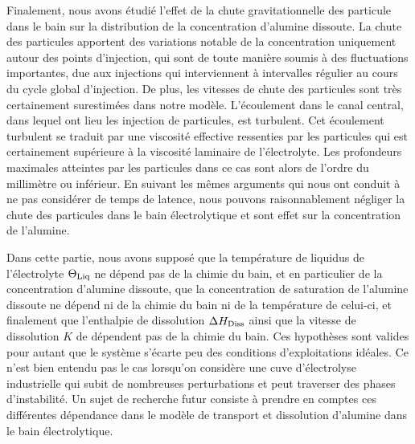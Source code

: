 Finalement, nous avons étudié l'effet de la chute gravitationnelle des
particule dans le bain sur la distribution de la concentration
d'alumine dissoute. La chute des particules apportent des variations
notable de la concentration uniquement autour des points d'injection,
qui sont de toute manière soumis à des fluctuations importantes, due
aux injections qui interviennent à intervalles régulier au cours du
cycle global d'injection. De plus, les vitesses de chute des
particules sont très certainement surestimées dans notre
modèle. L'écoulement dans le canal central, dans lequel ont lieu les
injection de particules, est turbulent. Cet écoulement turbulent se
traduit par une viscosité effective ressenties par les particules qui
est certainement supérieure à la viscosité laminaire de
l'électrolyte. Les profondeurs maximales atteintes par les particules
dans ce cas sont alors de l'ordre du millimètre ou inférieur. En
suivant les mêmes arguments qui nous ont conduit à ne pas considérer
de temps de latence, nous pouvons raisonnablement négliger la chute
des particules dans le bain électrolytique et sont effet sur la
concentration de l'alumine.

Dans cette partie, nous avons supposé que la température de liquidus de
l'électrolyte $\Theta_\text{Liq}$ ne dépend pas de la chimie du bain, et en
particulier de la concentration d'alumine dissoute, que la
concentration de saturation de l'alumine dissoute ne dépend ni de la
chimie du bain ni de la température de celui-ci, et finalement que
l'enthalpie de dissolution $\Delta H_\text{Diss}$ ainsi que la vitesse
de dissolution $K$ de dépendent pas de la chimie du bain. Ces hypothèses
sont valides pour autant que le système s'écarte peu des conditions
d'exploitations idéales. Ce n'est bien entendu pas le cas lorsqu'on
considère une cuve d'électrolyse industrielle qui subit de nombreuses
perturbations et peut traverser des phases d'instabilité. Un sujet de
recherche futur consiste à prendre en comptes ces différentes
dépendance dans le modèle de transport et dissolution d'alumine dans
le bain électrolytique.


%
